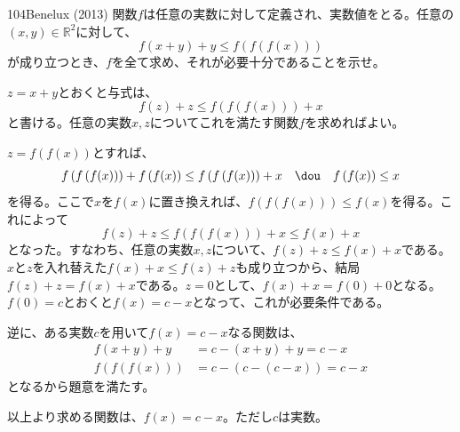 \begin{prob}{104}{}{Benelux (2013)}
 関数$f$は任意の実数に対して定義され、実数値をとる。任意の$(x,y)\in\mathbb{R}^2$に対して、
 \[ f(x+y)+y \leq f\left(f\left(f(x)\right)\right) \]
 が成り立つとき、$f$を全て求め、それが必要十分であることを示せ。
\end{prob}
$z=x+y$とおくと与式は、
\[ f(z)+z \le f\left(f\left(f(x)\right)\right)+x \]
と書ける。任意の実数$x, z$についてこれを満たす関数$f$を求めればよい。

$z=f\left(f(x)\right)$とすれば、
\[ f\left(f\left(f(x)\right)\right)+f\left(f(x)\right)\le f\left(f\left(f(x)\right)\right)+x \quad\dou\quad f\left(f(x)\right)\le x \]
を得る。ここで$x$を$f(x)$に置き換えれば、$f\left(f\left(f(x)\right)\right) \le f(x)$を得る。これによって
\[ f(z)+z \le f\left(f\left(f(x)\right)\right)+x \le f(x)+x \]
となった。すなわち、任意の実数$x, z$について、$f(z)+z\le f(x)+x$である。$x$と$z$を入れ替えた$f(x)+x\le f(z)+z$も成り立つから、結局$f(z)+z=f(x)+x$である。$z=0$として、$f(x)+x=f(0)+0$となる。$f(0)=c$とおくと$f(x)=c-x$となって、これが必要条件である。

逆に、ある実数$c$を用いて$f(x)=c-x$なる関数は、
\begin{align*}
 f(x+y)+y&=c-(x+y)+y=c-x \\
 f\left(f\left(f(x)\right)\right)&=c-\left(c-\left(c-x\right)\right)=c-x
\end{align*}
となるから題意を満たす。

以上より求める関数は、$f(x)=c-x$。ただし$c$は実数。
